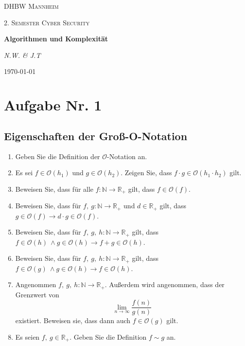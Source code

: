 \documentclass[12px,a4paper]{article}
\begin{document}
\begin{titlepage}
	\centering
	{\scshape\LARGE DHBW Mannheim \par}
	\vspace{1cm}
	{\scshape\Large 2. Semester Cyber Security\par}
	\vspace{1.5cm}
	{\huge\bfseries Algorithmen und Komplexität\par}
	\vspace{2cm}
	{\Large\itshape N.W. \& J.T\par}
	\vfill

	{\large \today\par} 
\end{titlepage}
\newpage
\justify

\section*{Aufgabe Nr. 1}
\subsection*{Eigenschaften der Groß-O-Notation}
\begin{enumerate}
	\item Geben Sie die Definition der $\mathcal{O}$-Notation an.
	\item Es sei $f \in \mathcal{O}(h_1)$ und $g \in \mathcal{O}(h_2)$. Zeigen Sie, dass $f \cdot g \in \mathcal{O}(h_1 \cdot h_2)$ gilt.
	\item Beweisen Sie, dass für alle $f: \mathbb{N} \rightarrow \mathbb{R}_+$ gilt, dass $f \in \mathcal{O}(f)$.
	\item Beweisen Sie, dass für $f, \: g: \mathbb{N} \rightarrow \mathbb{R}_+$ und $d \in \mathbb{R}_+$ gilt, dass \\ \noindent\hspace*{5mm} $g \in \mathcal{O}(f) \rightarrow d \cdot g \in \mathcal{O}(f)$.
	\item Beweisen Sie, dass für $f, \: g, \: h: \mathbb{N} \rightarrow \mathbb{R}_+$ gilt, dass \\ \noindent\hspace*{5mm} $f \in \mathcal{O}(h) \ \land g \in \mathcal{O}(h) \rightarrow f+g \in \mathcal{O}(h)$.
	\item Beweisen Sie, dass für $f, \: g, \: h: \mathbb{N} \rightarrow \mathbb{R}_+$ gilt, dass \\ \noindent\hspace*{5mm} $f \in \mathcal{O}(g) \ \land g \in \mathcal{O}(h) \rightarrow f \in \mathcal{O}(h)$.
	\item Angenommen $f, \: g, \: h: \mathbb{N} \rightarrow \mathbb{R}_+$. Außerdem wird angenommen, dass der Grenzwert von  \noindent\hspace*{5mm}  $$\lim\limits_{n \rightarrow \infty} \frac{f(n)}{g(n)}$$ existiert. Beweisen sie, dass dann auch $f \in \mathcal{O}(g)$ gilt.
	\item Es seien $f, \: g \in \mathbb{R}_+$. Geben Sie die Definition $f \sim g$ an.
\end{enumerate}
\end{document}
